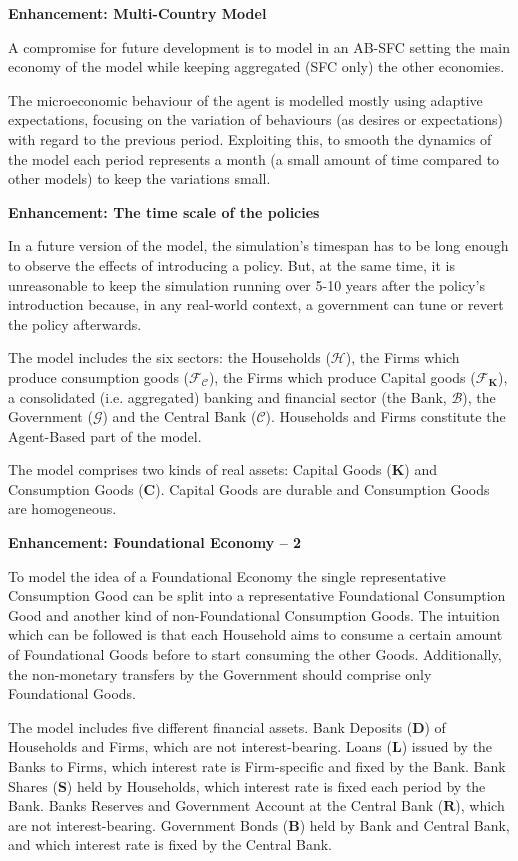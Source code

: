 \documentclass[a4paper, headings=standardclasses]{scrartcl}
\newenvironment{enh}[1][]{\begin{framed}\noindent\textbf{Enhancement: #1}\par}{\end{framed}}
\begin{document}
\begin{enh}[Multi-Country Model]
	A compromise for future development is to model in an AB-SFC setting the main economy of the model while keeping aggregated (SFC only) the other economies.
\end{enh}

The microeconomic behaviour of the agent is modelled mostly using adaptive expectations, focusing on the variation of behaviours (as desires or expectations) with regard to the previous period.
Exploiting this, to smooth the dynamics of the model each period represents a month (a small amount of time compared to other models) to keep the variations small.

\begin{enh}[The time scale of the policies]
	In a future version of the model, the simulation's timespan has to be long enough to observe the effects of introducing a policy. But, at the same time, it is unreasonable to keep the simulation running over 5-10 years after the policy's introduction because, in any real-world context, a government can tune or revert the policy afterwards.
\end{enh}

The model includes the six sectors: the Households ($\mathcal{H}$), the Firms which produce consumption goods ($\mathcal{F}_{\mathcal{C}}$), the Firms which produce Capital goods ($\mathcal{F}_{\mathbf{K}}$), a consolidated (i.e. aggregated) banking and financial sector (the Bank, $\mathcal{B}$), the Government ($\mathcal{G}$) and the Central Bank ($\mathcal{C}$). Households and Firms constitute the Agent-Based part of the model.

The model comprises two kinds of real assets: Capital Goods ($\mathbf{K}$) and Consumption Goods ($\mathbf{C}$).
Capital Goods are durable and Consumption Goods are homogeneous.

\begin{enh}[Foundational Economy -- 2]
	To model the idea of a Foundational Economy the single representative Consumption Good can be split into a representative Foundational Consumption Good and another kind of non-Foundational Consumption Goods.
	The intuition which can be followed is that each Household aims to consume a certain amount of Foundational Goods before to start consuming the other Goods. Additionally, the non-monetary transfers by the Government should comprise only Foundational Goods.
\end{enh}

The model includes five different financial assets.
Bank Deposits ($\mathbf{D}$) of Households and Firms, which are not interest-bearing.
Loans ($\mathbf{L}$) issued by the Banks to Firms, which interest rate is Firm-specific and fixed by the Bank.
Bank Shares ($\mathbf{S}$) held by Households, which interest rate is fixed each period by the Bank.
Banks Reserves and Government Account at the Central Bank ($\mathbf{R}$), which are not interest-bearing.
Government Bonds ($\mathbf{B}$) held by Bank and Central Bank, and which interest rate is fixed by the Central Bank.
\end{document}
